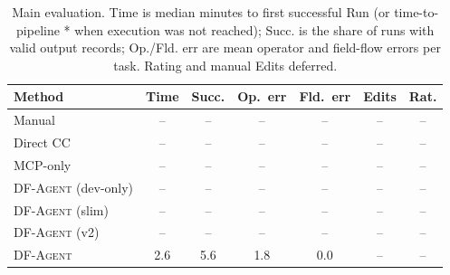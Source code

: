 \begin{table}[t]
\centering
\small
\setlength{\tabcolsep}{3pt}
\begin{tabular}{lcccccc}
\toprule
Method & Time & Succ. & Op.\ err & Fld.\ err & Edits & Rat. \\
\midrule
Manual & -- & -- & -- & -- & -- & -- \\
Direct CC & -- & -- & -- & -- & -- & -- \\
MCP-only & -- & -- & -- & -- & -- & -- \\
\textsc{DF-Agent} (dev-only) & -- & -- & -- & -- & -- & -- \\
\textsc{DF-Agent} (slim) & -- & -- & -- & -- & -- & -- \\
\textsc{DF-Agent} (v2) & -- & -- & -- & -- & -- & -- \\
\textsc{DF-Agent} & 2.6 & 5.6 & 1.8 & 0.0 & -- & -- \\
\bottomrule
\end{tabular}
\caption{Main evaluation. Time is median minutes to first successful Run (or time-to-pipeline * when execution was not reached); Succ. is the share of runs with valid output records; Op./Fld. err are mean operator and field-flow errors per task. Rating and manual Edits deferred.}
\label{tab:eval}
\end{table}
